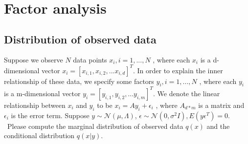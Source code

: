 \documentclass{article}
\begin{document}
\section{Factor analysis}
\subsection{Distribution of observed data}
Suppose we observe $N$ data points $x_i , i = 1,... , N$ , where each $x_i$ is a d-dimensional vector
$x_i = [x_{i,1}, x_{i,2},... x_{i,d}]^T$.
In order to explain the inner relationship of these data, we specify some factors $y_i , i = 1,... , N$ ,
where each $y_i$ is a m-dimensional vector $y_i = [y_{i,1}, y_{i,2},... y_{i,m}]^T$.
We denote the linear relationship between $x_i$ and $y_i$ to be $x_i = Ay_i + \epsilon_i $ ,
where $A_{d*m}$ is a matrix and $ \epsilon_i $ is the error term.
Suppose $y \sim \mathcal{N} (\mu, \Lambda)$, $\epsilon \sim \mathcal{N} (0, \sigma^2I), E(y\epsilon^T ) = 0$. \
Please compute the marginal distribution of observed data $q(x)$ and the conditional distribution $q(x|y)$.
\end{document}
